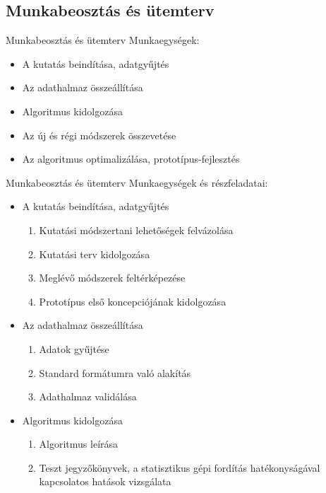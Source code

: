 
\subsection{Munkabeosztás és ütemterv}

\begin{frame}{Munkabeosztás és ütemterv}
Munkaegységek:
\begin{itemize}
  \item {A kutatás beindítása, adatgyűjtés}
  \item {Az adathalmaz összeállítása}
  \item {Algoritmus kidolgozása}
  \item {Az új és régi módszerek összevetése}
  \item {Az algoritmus optimalizálása, prototípus-fejlesztés}
  \end{itemize}
\end{frame}


\begin{frame}{Munkabeosztás és ütemterv}
Munkaegységek és részfeladatai:
\begin{itemize}
  \item<1-> {
    A kutatás beindítása, adatgyűjtés
    \begin{enumerate}
	    \item Kutatási módszertani lehetőségek felvázolása
	    \item Kutatási terv kidolgozása
	    \item Meglévő módszerek feltérképezése
	    \item Prototípus első koncepciójának kidolgozása
    \end{enumerate}
  }
  \item<2-> {   
    Az adathalmaz összeállítása
    \begin{enumerate}
        \item Adatok gyűjtése
        \item Standard formátumra való alakítás
        \item Adathalmaz validálása
    \end{enumerate}
  }
  \item<3-> {
    Algoritmus kidolgozása
    \begin{enumerate}
        \item Algoritmus leírása
        \item Teszt jegyzőkönyvek, a statisztikus gépi fordítás hatékonyságával kapcsolatos hatások vizsgálata
    \end{enumerate}
  }
  \end{itemize}
\end{frame}

